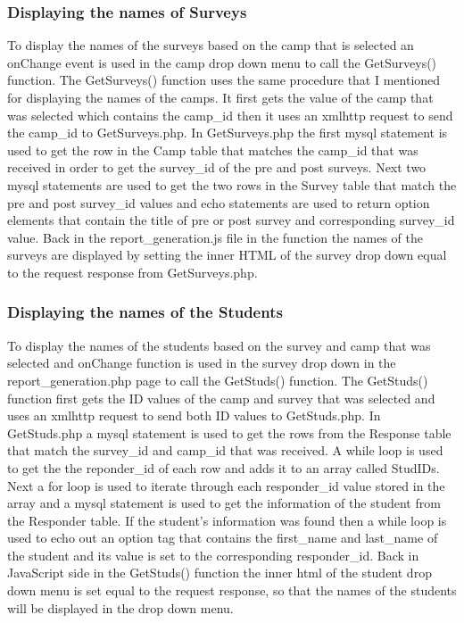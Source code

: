 \documentclass[../final.tex]{subfiles}
\begin{document}
	\subsubsection{Displaying the names of Surveys}
	To display the names of the surveys based on the camp that is selected an onChange event is used in the camp drop down menu to call the GetSurveys() function. The GetSurveys() function uses the same procedure that I mentioned for displaying the names of the camps. It first gets the value of the camp that was selected which contains the camp\_id then it uses an xmlhttp request to send the camp\_id to GetSurveys.php. In GetSurveys.php the first mysql statement is used to get the row in the Camp table that matches the camp\_id that was received in order to get the survey\_id of the pre and post surveys. Next two mysql statements are used to get the two rows in the Survey table that match the pre and post survey\_id values and echo statements are used to return option elements that contain the title of pre or post survey and corresponding survey\_id value. Back in the report\_generation.js file in the function the names of the surveys are displayed by setting the inner HTML of the survey drop down equal to the request response from GetSurveys.php. 
	\subsubsection{Displaying the names of the Students}
	To display the names of the students based on the survey and camp that was selected and onChange function is used in the survey drop down in the report\_generation.php page to call the GetStuds() function. The GetStuds() function first gets the ID values of the camp and survey that was selected and uses an xmlhttp request to send both ID values to GetStuds.php. In GetStuds.php a mysql statement is used to get the rows from the Response table that match the survey\_id and camp\_id that was received. A while loop is used to get the the reponder\_id of each row and adds it to an array called StudIDs. Next a for loop is used to iterate through each responder\_id value stored in the array and a mysql statement is used to get the information of the student from the Responder table. If the student's information was found then a while loop is used to echo out an option  tag that contains the first\_name and last\_name of the student and its value is set to the corresponding responder\_id. Back in JavaScript side in the GetStuds() function the inner html of the student drop down menu is set equal to the request response, so that the names of the students will be displayed in the drop down menu. 
\end{document}
